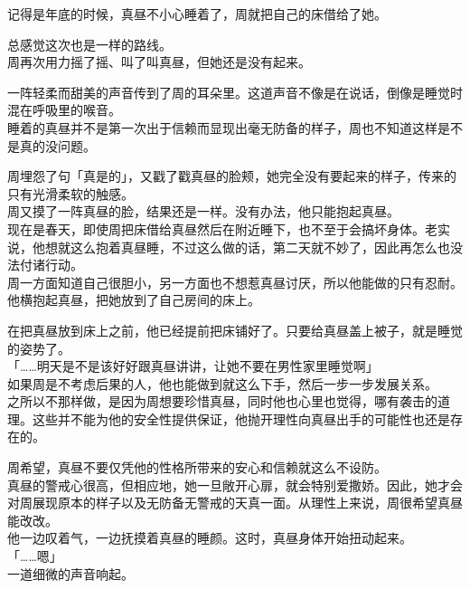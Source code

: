 记得是年底的时候，真昼不小心睡着了，周就把自己的床借给了她。

总感觉这次也是一样的路线。\\

周再次用力摇了摇、叫了叫真昼，但她还是没有起来。

一阵轻柔而甜美的声音传到了周的耳朵里。这道声音不像是在说话，倒像是睡觉时混在呼吸里的喉音。\\

睡着的真昼并不是第一次出于信赖而显现出毫无防备的样子，周也不知道这样是不是真的没问题。

周埋怨了句「真是的」，又戳了戳真昼的脸颊，她完全没有要起来的样子，传来的只有光滑柔软的触感。\\

周又摸了一阵真昼的脸，结果还是一样。没有办法，他只能抱起真昼。\\

现在是春天，即使周把床借给真昼然后在附近睡下，也不至于会搞坏身体。老实说，他想就这么抱着真昼睡，不过这么做的话，第二天就不妙了，因此再怎么也没法付诸行动。\\

周一方面知道自己很胆小，另一方面也不想惹真昼讨厌，所以他能做的只有忍耐。他横抱起真昼，把她放到了自己房间的床上。

在把真昼放到床上之前，他已经提前把床铺好了。只要给真昼盖上被子，就是睡觉的姿势了。\\

「……明天是不是该好好跟真昼讲讲，让她不要在男性家里睡觉啊」\\

如果周是不考虑后果的人，他也能做到就这么下手，然后一步一步发展关系。\\

之所以不那样做，是因为周想要珍惜真昼，同时他也心里也觉得，哪有袭击的道理。这些并不能为他的安全性提供保证，他抛开理性向真昼出手的可能性也还是存在的。

周希望，真昼不要仅凭他的性格所带来的安心和信赖就这么不设防。\\

真昼的警戒心很高，但相应地，她一旦敞开心扉，就会特别爱撒娇。因此，她才会对周展现原本的样子以及无防备无警戒的天真一面。从理性上来说，周很希望真昼能改改。\\

他一边叹着气，一边抚摸着真昼的睡颜。这时，真昼身体开始扭动起来。\\

「……嗯」\\

一道细微的声音响起。

